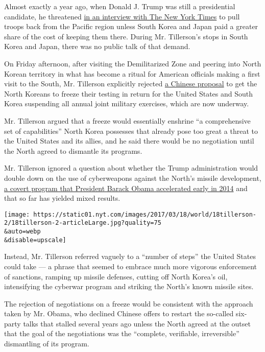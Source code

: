 Almost exactly a year ago, when Donald J. Trump was still a presidential
candidate, he threatened
\href{https://www.nytimes.com/2016/03/27/us/politics/donald-trump-foreign-policy.html}{in
an interview with The New York Times} to pull troops back from the
Pacific region unless South Korea and Japan paid a greater share of the
cost of keeping them there. During Mr. Tillerson's stops in South Korea
and Japan, there was no public talk of that demand.

On Friday afternoon, after visiting the Demilitarized Zone and peering
into North Korean territory in what has become a ritual for American
officials making a first visit to the South, Mr. Tillerson explicitly
rejected
\href{https://www.nytimes.com/2017/03/08/world/asia/china-north-korea-thaad-nuclear.html}{a
Chinese proposal} to get the North Koreans to freeze their testing in
return for the United States and South Korea suspending all annual joint
military exercises, which are now underway.

Mr. Tillerson argued that a freeze would essentially enshrine ``a
comprehensive set of capabilities'' North Korea possesses that already
pose too great a threat to the United States and its allies, and he said
there would be no negotiation until the North agreed to dismantle its
programs.

Mr. Tillerson ignored a question about whether the Trump administration
would double down on the use of cyberweapons against the North's missile
development,
\href{https://www.nytimes.com/2017/03/04/world/asia/north-korea-missile-program-sabotage.html}{a
covert program that President Barack Obama accelerated early in 2014}
and that so far has yielded mixed results.

\texttt{[image: https://static01.nyt.com/images/2017/03/18/world/18tillerson-2/18tillerson-2-articleLarge.jpg?quality=75\\\&auto=webp\\\&disable=upscale]}

Instead, Mr. Tillerson referred vaguely to a ``number of steps'' the
United States could take --- a phrase that seemed to embrace much more
vigorous enforcement of sanctions, ramping up missile defenses, cutting
off North Korea's oil, intensifying the cyberwar program and striking
the North's known missile sites.

The rejection of negotiations on a freeze would be consistent with the
approach taken by Mr. Obama, who declined Chinese offers to restart the
so-called six-party talks that stalled several years ago unless the
North agreed at the outset that the goal of the negotiations was the
``complete, verifiable, irreversible'' dismantling of its program.


